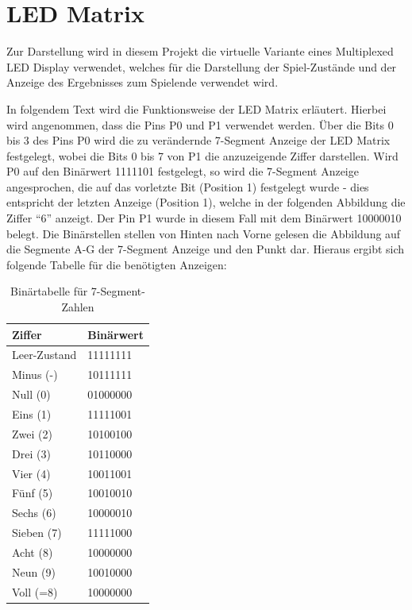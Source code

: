 \documentclass[11pt,ngerman]{report}
\begin{document}
\section{LED Matrix}

Zur Darstellung wird in diesem Projekt die virtuelle Variante eines Multiplexed LED Display verwendet, welches für die Darstellung der Spiel-Zustände und der Anzeige des Ergebnisses zum Spielende verwendet wird.

In folgendem Text wird die Funktionsweise der LED Matrix erläutert. Hierbei wird angenommen, dass die Pins P0 und P1 verwendet werden. Über die Bits 0 bis 3 des Pins P0 wird die zu verändernde 7-Segment Anzeige der LED Matrix festgelegt, wobei die Bits 0 bis 7 von P1 die anzuzeigende Ziffer darstellen.
Wird P0 auf den Binärwert 1111101 festgelegt, so wird die 7-Segment Anzeige angesprochen, die auf das vorletzte Bit (Position 1) festgelegt wurde - dies entspricht der letzten Anzeige (Position 1), welche in der folgenden Abbildung die Ziffer “6” anzeigt. Der Pin P1 wurde in diesem Fall mit dem Binärwert 10000010 belegt. Die Binärstellen stellen von Hinten nach Vorne gelesen die Abbildung auf die Segmente A-G der 7-Segment Anzeige und den Punkt dar. Hieraus ergibt sich folgende Tabelle für die benötigten Anzeigen:

\begin{table}[]
	\centering
	\caption{Binärtabelle für 7-Segment-Zahlen}
	\begin{tabular}{@{}ll@{}}
		\toprule
		Ziffer       & Binärwert \\ \midrule
		Leer-Zustand & 11111111  \\
		Minus (-)    & 10111111  \\
		Null (0)     & 01000000  \\
		Eins (1)     & 11111001  \\
		Zwei (2)     & 10100100  \\
		Drei (3)     & 10110000  \\
		Vier (4)     & 10011001  \\
		Fünf (5)     & 10010010  \\
		Sechs (6)    & 10000010  \\
		Sieben (7)   & 11111000  \\
		Acht (8)     & 10000000  \\
		Neun (9)     & 10010000  \\
		Voll (=8)    & 10000000  \\ \bottomrule
	\end{tabular}
\end{table}
\end{document}
